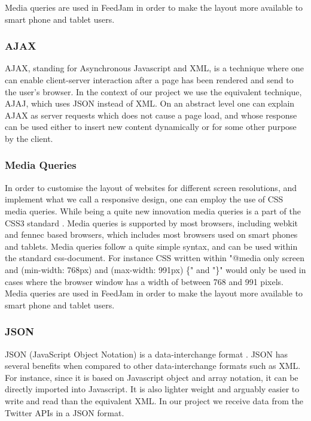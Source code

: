 Media queries are used in FeedJam in order to make the layout more available to smart phone and tablet users.

\subsubsection{AJAX}%
AJAX, standing for Asynchronous Javascript and XML, is a technique where one can enable client-server interaction after a page has been rendered and send to the user's browser. In the context of our project we use the equivalent technique, AJAJ, which uses JSON instead of XML. On an abstract level one can explain AJAX as server requests which does not cause a page load, and whose response can be used either to insert new content dynamically or for some other purpose by the client.

\subsubsection{Media Queries} %
In order to customise the layout of websites for different screen resolutions, and implement what we call a responsive design, one can employ the use of CSS media queries. While being a quite new innovation media queries is a part of the CSS3 standard \cite{W3C}. Media queries is supported by most browsers, including webkit and fennec based browsers, which includes most browsers used on smart phones and tablets. Media queries follow a quite simple syntax, and can be used within the standard css-document. For instance CSS written within "@media only screen and (min-width: 768px) and (max-width: 991px) \{" and "\}" would only be used in cases where the browser window has a width of between 768 and 991 pixels. Media queries are used in FeedJam in order to make the layout more available to smart phone and tablet users.

\subsubsection{JSON}
JSON (JavaScript Object Notation) is a data-interchange format \cite{Crockford2011}. JSON has several benefits when compared to other data-interchange formats such as XML. For instance, since it is based on Javascript object and array notation, it can be directly imported into Javascript. It is also lighter weight and arguably easier to write and read than the equivalent XML. In our project we receive data from the Twitter APIs in a JSON format.

